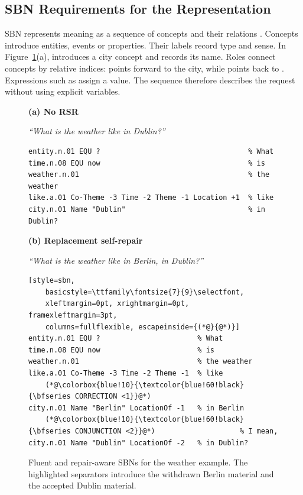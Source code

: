 \documentclass{article}
\begin{document}
\subsection{SBN Requirements for the Representation}
\label{sec:sbn-brief}

SBN represents meaning as a sequence of concepts and their relations
\citep{bosSequenceNotationCatching2023}. Concepts introduce entities, events
or properties. Their labels record type and sense. In
Figure~\ref{fig:weather-rsr-comparison}(a),  introduces a
city concept and  records its name. Roles connect concepts by
relative indices:  points forward to the city, while
 points back to . Expressions such as
 assign a value. The sequence therefore describes the request
without using explicit variables.

\begin{figure}[H]
\centering
\begin{minipage}[t]{0.53\textwidth}
\raggedright
\textbf{(a) No RSR}\par\smallskip
\parbox[t][3\baselineskip][t]{\linewidth}{\small\raggedright
\textit{``What is the weather like in Dublin?''}}
\begin{lstlisting}[style=sbn,
    basicstyle=\ttfamily\fontsize{7}{9}\selectfont,
    xleftmargin=0pt, xrightmargin=0pt, framexleftmargin=3pt,
    columns=fullflexible]
entity.n.01 EQU ?                                   % What
time.n.08 EQU now                                   % is
weather.n.01                                        % the weather
like.a.01 Co-Theme -3 Time -2 Theme -1 Location +1  % like 
city.n.01 Name "Dublin"                             % in Dublin?
\end{lstlisting}
\end{minipage}\hfill
\begin{minipage}[t]{0.42\textwidth}
\raggedright
\textbf{(b) Replacement self-repair}\par\smallskip
\parbox[t][3\baselineskip][t]{\linewidth}{\small\raggedright
\textit{``What is the weather like in Berlin, in Dublin?''}}
\begin{lstlisting}[style=sbn,
    basicstyle=\ttfamily\fontsize{7}{9}\selectfont,
    xleftmargin=0pt, xrightmargin=0pt, framexleftmargin=3pt,
    columns=fullflexible, escapeinside={(*@}{@*)}]
entity.n.01 EQU ?                       % What
time.n.08 EQU now                       % is
weather.n.01                            % the weather
like.a.01 Co-Theme -3 Time -2 Theme -1  % like 
    (*@\colorbox{blue!10}{\textcolor{blue!60!black}{\bfseries CORRECTION <1}}@*)
city.n.01 Name "Berlin" LocationOf -1   % in Berlin
    (*@\colorbox{blue!10}{\textcolor{blue!60!black}{\bfseries CONJUNCTION <2}}@*)                    % I mean, 
city.n.01 Name "Dublin" LocationOf -2   % in Dublin?
\end{lstlisting}
\end{minipage}
\caption{Fluent and repair-aware SBNs for the weather example. The highlighted
separators introduce the withdrawn Berlin material and the accepted Dublin
material.}
\label{fig:weather-rsr-comparison}
\end{figure}
\end{document}
